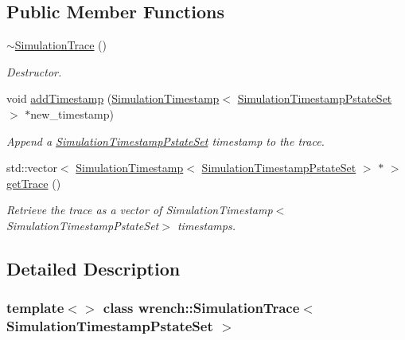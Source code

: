 \subsection*{Public Member Functions}
\begin{DoxyCompactItemize}
\item 
\mbox{\label{classwrench_1_1_simulation_trace_3_01_simulation_timestamp_pstate_set_01_4_ad65341b4595f88f09106cea922765bdc}} 
\hyperlink{classwrench_1_1_simulation_trace_3_01_simulation_timestamp_pstate_set_01_4_ad65341b4595f88f09106cea922765bdc}{$\sim$\+Simulation\+Trace} ()
\begin{DoxyCompactList}\small\item\em Destructor. \end{DoxyCompactList}\item 
void \hyperlink{classwrench_1_1_simulation_trace_3_01_simulation_timestamp_pstate_set_01_4_a1f835fad40b9f45bf25111a1636e86b7}{add\+Timestamp} (\hyperlink{classwrench_1_1_simulation_timestamp}{Simulation\+Timestamp}$<$ \hyperlink{classwrench_1_1_simulation_timestamp_pstate_set}{Simulation\+Timestamp\+Pstate\+Set} $>$ $\ast$new\+\_\+timestamp)
\begin{DoxyCompactList}\small\item\em Append a \hyperlink{classwrench_1_1_simulation_timestamp_pstate_set}{Simulation\+Timestamp\+Pstate\+Set} timestamp to the trace. \end{DoxyCompactList}\item 
std\+::vector$<$ \hyperlink{classwrench_1_1_simulation_timestamp}{Simulation\+Timestamp}$<$ \hyperlink{classwrench_1_1_simulation_timestamp_pstate_set}{Simulation\+Timestamp\+Pstate\+Set} $>$ $\ast$ $>$ \hyperlink{classwrench_1_1_simulation_trace_3_01_simulation_timestamp_pstate_set_01_4_a779e26ba2ab24051e8caf8371b6b2cc6}{get\+Trace} ()
\begin{DoxyCompactList}\small\item\em Retrieve the trace as a vector of Simulation\+Timestamp$<$\+Simulation\+Timestamp\+Pstate\+Set$>$ timestamps. \end{DoxyCompactList}\end{DoxyCompactItemize}


\subsection{Detailed Description}
\subsubsection*{template$<$$>$\newline
class wrench\+::\+Simulation\+Trace$<$ Simulation\+Timestamp\+Pstate\+Set $>$}

